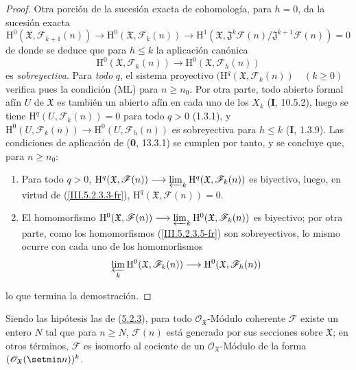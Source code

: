 \begin{proof}
Otra porción de la sucesión exacta de cohomología, para $h=0$, da la sucesión
exacta
\begin{equation}
\mathrm H^0(\mathfrak X,\mathcal F_{k+1}(n))\to
\mathrm H^0(\mathfrak X,\mathcal F_k(n))\to
\mathrm H^1(\mathfrak X,
\mathfrak J^k\mathcal F(n)/\mathfrak J^{k+1}\mathcal F(n))=0
\tag{5.2.3.4}
\label{III.5.2.3.4-fr}
\end{equation}
de donde se deduce que para $h\leq k$ la aplicación canónica
\begin{equation}
\mathrm H^0(\mathfrak X,\mathcal F_k(n))\longrightarrow
\mathrm H^0(\mathfrak X,\mathcal F_h(n))
\tag{5.2.3.5}
\label{III.5.2.3.5-fr}
\end{equation}
es \emph{sobreyectiva}. Para \emph{todo} $q$, el sistema proyectivo
$(\mathrm H^q(\mathfrak X,\mathcal F_k(n))\quad(k\geq0)$ verifica pues la condición
(ML) para $n\geq n_0$. Por otra parte, todo abierto formal afín $U$ de $\mathfrak X$
es también un abierto afín en cada uno de los $X_k$ (\textbf{I}, 10.5.2), luego se tiene
$\mathrm H^q(U,\mathcal F_k(n))=0$ para todo $q>0$ (1.3.1), y
$\mathrm H^0(U,\mathcal F_k(n))\to\mathrm H^0(U,\mathcal F_h(n))$ es sobreyectiva
para $h\leq k$ (\textbf{I}, 1.3.9). Las condiciones de aplicación de (\textbf{0}, 13.3.1) se
cumplen por tanto, y se concluye que, para $n\geq n_0$:
\begin{enumerate}
\item[$1^\circ$] Para todo $q>0$,
$\mathrm H^q(\mathfrak X,\mathcal F(n))\longrightarrow
\varprojlim_k\mathrm H^q(\mathfrak X,\mathcal F_k(n))$
es biyectivo, luego, en virtud de (\ref{III.5.2.3.3-fr}),
$\mathrm H^q(\mathfrak X,\mathcal F(n))=0$.
\item[$2^\circ$] El homomorfismo
$\mathrm H^0(\mathfrak X,\mathcal F(n))\longrightarrow
\varprojlim_k\mathrm H^0(\mathfrak X,\mathcal F_k(n))$
es biyectivo; por otra parte, como los homomorfismos
(\ref{III.5.2.3.5-fr}) son sobreyectivos, lo mismo ocurre con cada uno de los
homomorfismos
\[
\varprojlim_k\mathrm H^0(\mathfrak X,\mathcal F_k(n))
\longrightarrow\mathrm H^0(\mathfrak X,\mathcal F_h(n))
\]
\end{enumerate}
lo que termina la demostración.
\end{proof}

\begin{corollary}[5.2.4]
\label{III.5.2.4-fr}
Siendo las hipótesis las de \textup{(\hyperref[III.5.2.3-fr]{5.2.3})}, para todo
$\mathcal O_{\mathfrak X}$-Módulo coherente $\mathcal F$ existe un entero $N$
tal que para $n\geq N$, $\mathcal F(n)$ está generado por sus secciones sobre
$\mathfrak X$; en otros términos, $\mathcal F$ es isomorfo al cociente de un
$\mathcal O_{\mathfrak X}$-Módulo de la forma
$(\mathcal O_{\mathfrak X}(\setmin n))^k$.
\end{corollary}

